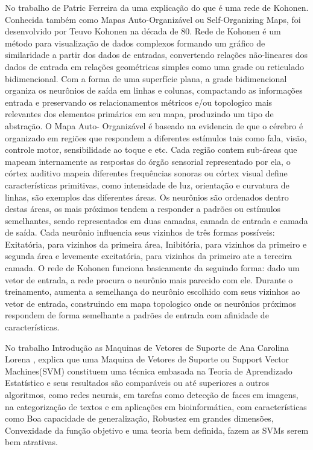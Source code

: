 No trabalho de Patric Ferreira \cite{Patric} da uma explicação do que é uma rede de Kohonen. 
Conhecida também como Mapas Auto-Organizável ou Self-Organizing Maps, foi desenvolvido por Teuvo Kohonen na década de 80. 
Rede de Kohonen é um método para visualização de dados complexos formando um gráfico de similaridade a partir dos dados de entradas, convertendo relações não-lineares dos dados de entrada em relações geométricas simples como uma grade ou reticulado bidimencional. 
Com a forma de uma superfície plana, a grade bidimencional organiza os neurônios de saída em linhas e colunas, compactando as informações entrada e preservando os relacionamentos métricos e/ou topologico mais relevantes dos elementos primários em seu mapa, produzindo um tipo de abstração. 
O Mapa Auto- Organizável é baseado na evidencia de que o cérebro é organizado em regiões que respondem a diferentes estímulos tais como fala, visão, controle motor, sensibilidade ao toque e etc. Cada região contem sub-áreas que mapeam internamente as respostas do órgão sensorial representado por ela, o córtex auditivo mapeia diferentes frequências sonoras ou córtex visual define características primitivas, como intensidade de luz, orientação e curvatura de linhas, são exemplos das diferentes áreas. Os neurônios são ordenados dentro destas áreas, os mais próximos tendem a responder a padrões ou estímulos semelhantes, sendo representados em duas camadas, camada de entrada e camada de saída. Cada neurônio influencia seus vizinhos de três formas possíveis: Exitatória, para vizinhos da primeira área, Inibitória, para vizinhos da  primeiro e segunda área e levemente excitatória, para vizinhos da primeiro ate a terceira camada. 
O rede de Kohonen funciona basicamente da seguindo forma: dado um vetor de entrada, a rede procura o neurônio mais parecido com ele. Durante o treinamento, aumenta a semelhança do neurônio escolhido com seus vizinhos ao vetor de entrada, construindo em mapa topologico onde os neurônios próximos respondem de forma semelhante a padrões de entrada com afinidade de características.

No trabalho Introdução as Maquinas de Vetores de Suporte de Ana Carolina Lorena \cite{AnaCarolina}, explica que uma Maquina de Vetores de Suporte ou Support Vector Machines(SVM) constituem uma técnica embasada na Teoria de Aprendizado Estatístico e seus resultados são comparáveis ou até superiores a outros algoritmos, como redes neurais, em tarefas como detecção de faces em imagens, na categorização de textos e em aplicações em bioinformática, com características como Boa capacidade de generalização, Robustez em grandes dimensões, Convexidade da função objetivo e uma teoria bem definida, fazem as SVMs serem bem atrativas.


